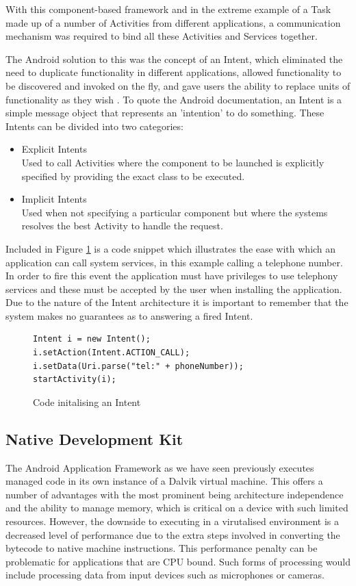 With this component-based framework and in the extreme example of a Task made up of a number of Activities from different applications, a communication mechanism was required to bind all these Activities and Services together.

The Android solution to this was the concept of an Intent, which eliminated the need to duplicate functionality in different applications, allowed functionality to be discovered and invoked on the fly, and gave users the ability to replace units of functionality as they wish \cite{rogers09}. To quote the Android documentation, an Intent is a simple message object that represents an 'intention' to do something. These Intents can be divided into two categories:

\begin{itemize}
\item Explicit Intents\\
Used to call Activities where the component to be launched is explicitly specified by providing the exact class to be executed.
\item Implicit Intents\\
Used when not specifying a particular component but where the systems resolves the best Activity to handle the request.
\end{itemize}

Included in Figure \ref{intent_code} is a code snippet which illustrates the ease with which an application can call system services, in this example calling a telephone number. In order to fire this event the application must have privileges to use telephony services and these must be accepted by the user when installing the application. Due to the nature of the Intent architecture it is important to remember that the system makes no guarantees as to answering a fired Intent.

\begin{figure}[h!]
\begin{lstlisting}
Intent i = new Intent();
i.setAction(Intent.ACTION_CALL);
i.setData(Uri.parse("tel:" + phoneNumber));
startActivity(i);
\end{lstlisting}
\caption{Code initalising an Intent}
\label{intent_code}
\end{figure}

\subsection{Native Development Kit}
The Android Application Framework as we have seen previously executes managed code in its own instance of a Dalvik virtual machine. This offers a number of advantages with the most prominent being architecture independence and the ability to manage memory, which is critical on a device with such limited resources. However, the downside to executing in a virutalised environment is a decreased level of performance due to the extra steps involved in converting the bytecode to native machine instructions. This performance penalty can be problematic for applications that are CPU bound. Such forms of processing would include processing data from input devices such as microphones or cameras.

